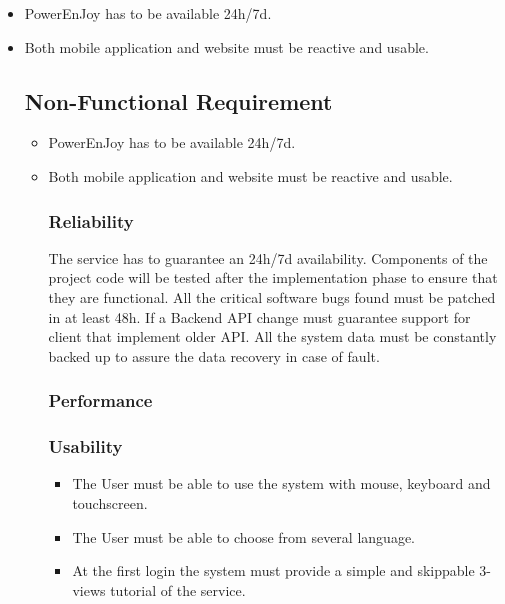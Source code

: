 \documentclass[english]{article}
\begin{document}
\begin{itemize}
	\item PowerEnJoy has to be available 24h/7d.
	\item Both mobile application and website must be reactive and usable.


\subsection{Non-Functional Requirement}

\begin{itemize}
	\item PowerEnJoy has to be available 24h/7d.
	\item Both mobile application and website must be reactive and usable.
	
\subsubsection{Reliability}%

The service has to guarantee an 24h/7d availability. Components of the project code will be tested after the implementation phase to ensure that they are functional. 
All the critical software bugs found must be patched in at least 48h.
If a Backend API change must guarantee support for client that implement older API.
All the system data must be constantly backed up to assure the data recovery in case of fault.


\subsubsection{Performance}

\subsubsection{Usability}
\begin{itemize}
	\item The User must be able to use the system with mouse, keyboard and touchscreen.
	\item The User must be able to choose from several language.
	\item At the first login the system must provide a simple and skippable 3-views tutorial of the service.
\end{itemize}


\end{itemize}
\end{itemize}
\end{document}
